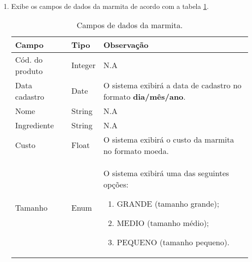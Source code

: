\begin{enumerate}[label=ED\arabic*]
	\item Exibe os campos de dados da marmita de acordo com a tabela \ref{uc017_tb_rn1}. \label{uc017_rn:1}
	\begin{table}[htb]
		\ABNTEXfontereduzida
		\caption[Campos de dados da marmita]{Campos de dados da marmita.}
		\label{uc017_tb_rn1}
		\begin{tabular}{|p{4.0cm}|p{3.0cm}|p{7.25cm}|}
			\hline
			\textbf{Campo}  & \textbf{Tipo} & \textbf{Observação}                                                   \\ \hline
			Cód. do produto & Integer       & N.A                                                                   \\ \hline
			Data cadastro   & Date          & O sistema exibirá a data de cadastro no formato \textbf{dia/mês/ano}. \\ \hline
			Nome            & String        & N.A                                                                   \\ \hline
			Ingrediente     & String        & N.A                                                                   \\ \hline
			Custo           & Float         & O sistema exibirá o custo da marmita no formato moeda.                \\ \hline
			Tamanho           & Enum          & O sistema exibirá uma das seguintes opções: 	
			\begin{enumerate}
				\item GRANDE (tamanho grande);
				\item MEDIO (tamanho médio);
				\item PEQUENO (tamanho pequeno).
			\end{enumerate}\\ \hline
		\end{tabular}
	\end{table}
\end{enumerate}